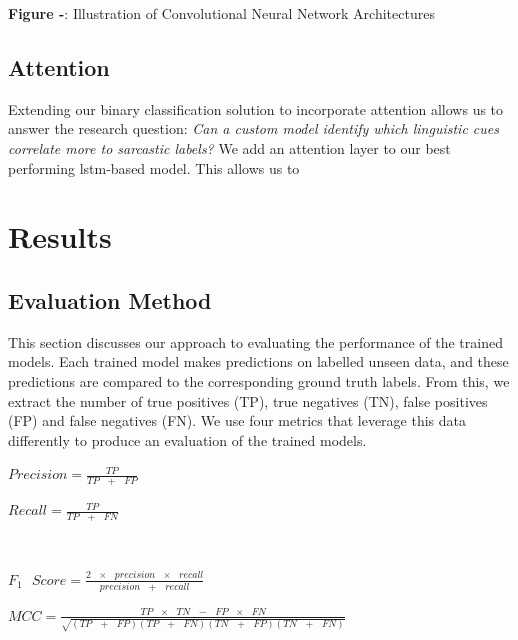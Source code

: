 \documentclass[12pt,a4paper]{article}
\begin{document}
\begin{center}
	\textbf{Figure -}: Illustration of Convolutional Neural Network Architectures
\end{center}




\subsection{Attention}
\vspace{-4.2pt}
\noindent Extending our binary classification solution to incorporate attention allows us to answer the research question: \textit{Can a custom model identify which linguistic cues correlate more to sarcastic labels?} We add an attention layer to our best performing lstm-based model. This allows us to 

\newpage
\section{Results}
\subsection{Evaluation Method}
\noindent This section discusses our approach to evaluating the performance of the trained models. Each trained model makes predictions on labelled unseen data, and these predictions are compared to the corresponding ground truth labels. From this, we extract the number of true positives (TP), true negatives (TN), false positives (FP) and false negatives (FN). We use four metrics that leverage this data differently to produce an evaluation of the trained models.

\hspace{-30pt}\begin{center}
	\begin{minipage}{0.47\textwidth}
		$Precision =\frac{TP}{TP\text{ } + \text{ }FP}$\\
	\end{minipage}
	\hspace{-30pt}\begin{minipage}{0.47\textwidth}
		$Recall =\frac{TP}{TP\text{ } + \text{ }FN}$\\
	\end{minipage}\\
\end{center}
\vspace{-20pt}
\begin{center}
	\begin{minipage}{0.47\textwidth}
		$F_1\text{ } Score =\frac{2 \text{ }\times\text{ } precision\text{ } \times \text{ }recall}{precision\text{ } + \text{ }recall}$
	\end{minipage}
	\hspace{-30pt}\begin{minipage}{0.47\textwidth}
		$MCC =\frac{TP \text{ } \times \text{ } TN \text{ } - \text{ } FP\text{ } \times \text{ } FN}{\sqrt{(TP \text{ } + \text{ } FP)(TP \text{ } + \text{ } FN)(TN \text{ } + \text{ } FP)(TN \text{ } + \text{ } FN)}}$
	\end{minipage}
\end{center}
\vspace{4pt}
\end{document}
